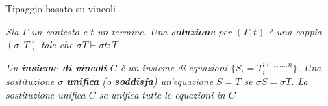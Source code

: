 \documentclass{beamer}
\begin{document}
\begin{tframe}{Tipaggio basato su vincoli}

\begin{definition}[Soluzione]
\textit{Sia $\Gamma$ un contesto e $t$ un termine. Una \textbf{soluzione} per $(\Gamma, t)$ è una coppia $(\sigma, T)$ tale che $\sigma T \vdash \sigma t : T$}
\end{definition}

\vspace{0.2cm}

\vspace{0.2cm}

\begin{definition}
\textit{Un \textbf{insieme di vincoli} $C$ è un insieme di equazioni $\{ S_i = T_{i}^{i \in 1, \ldots, n} \}$. Una sostituzione $\sigma$ \textbf{unifica} (o \textbf{soddisfa}) un'equazione $S = T$ se $\sigma S = \sigma T$. La sostituzione unifica $C$ se unifica tutte le equazioni in $C$}
\end{definition}
\end{tframe}

\end{document}
